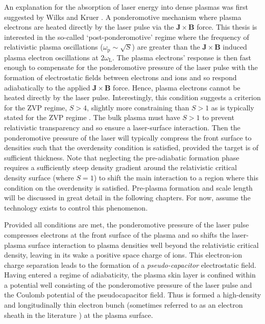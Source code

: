 An explanation for the absorption of laser energy into dense plasmas was first suggested by Wilks and Kruer \cite{wilksAbsorptionUltraIntenseLaser1992}. A ponderomotive mechanism where plasma electrons are heated directly by the laser pulse via the $\mathbf{J}\times \mathbf{B}$ force. This thesis is interested in the so-called `post-ponderomotive' regime where the frequency of relativistic plasma oscillations ($\omega_\mathrm{p} \sim \sqrt{S}$) are greater than the $\mathbf{J}\times \mathbf{B}$ induced plasma electron oscillations at $2\omega_\mathrm{L}$. The plasma electrons' response is then fast enough to compensate for the ponderomotive pressure of the laser pulse with the formation of electrostatic fields between electrons and ions and so respond adiabatically to the applied $\mathbf{J}\times \mathbf{B}$ force. Hence, plasma electrons cannot be heated directly by the laser pulse. Interestingly, this condition suggests a criterion for the \ac{ZVP} regime, $S > 4$, slightly more constraining than $S>1$ as is typically stated for the \ac{ZVP} regime \cite{savinModellingLaserPlasmaInteractions2019}. The bulk plasma must have $S>1$ to prevent relativistic transparency and so ensure a laser-surface interaction. Then the ponderomotive pressure of the laser will typically compress the front surface to densities such that the overdensity condition is satisfied, provided the target is of sufficient thickness. Note that neglecting the pre-adiabatic formation phase requires a sufficiently steep density gradient around the relativistic critical density surface (where $S=1$) to shift the main interaction to a region where this condition on the overdensity is satisfied. Pre-plasma formation and scale length will be discussed in great detail in the following chapters. For now, assume the technology exists to control this phenomenon. 

Provided all conditions are met, the ponderomotive pressure of the laser pulse compresses electrons at the front surface of the plasma and so shifts the laser-plasma surface interaction to plasma densities well beyond the relativistic critical density, leaving in its wake a positive space charge of ions. This electron-ion charge separation leads to the formation of a \textit{pseudo-capacitor} electrostatic field. Having entered a regime of adiabaticity, the plasma skin layer is confined within a potential well consisting of the ponderomotive pressure of the laser pulse and the Coulomb potential of the pseudocapacitor field. Thus is formed a high-density and longitudinally thin electron bunch (sometimes referred to as an electron sheath in the literature \cite{gonoskovUltrarelativisticNanoplasmonicsRoute2011}) at the plasma surface.


